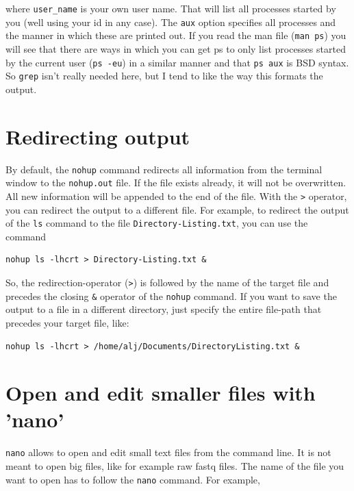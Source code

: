 \documentclass[11pt]{article}
\begin{document}
where \texttt{user\_name} is your own user name. That will list all processes started by
you (well using your id in any case). The \texttt{aux} option specifies all processes and
the manner in which these are printed out. If you read the man file (\texttt{man ps}) you
will see that there are ways in which you can get ps to only list processes started
by the current user (\texttt{ps -eu}) in a similar manner and that \texttt{ps aux} is BSD syntax.
So \texttt{grep} isn't really needed here, but I tend to like the way this formats the output.

\section{Redirecting output}
\label{sec-7}
By default, the \texttt{nohup} command redirects all information from the
terminal window to the \texttt{nohup.out} file. If the file exists already,
it will not be overwritten. All new information will be appended to
the end of the file. With the \texttt{>} operator, you can redirect the
output to a different file. For example, to redirect the output of the
\texttt{ls} command to the file \texttt{Directory-Listing.txt}, you can use the
command

\begin{verbatim}
nohup ls -lhcrt > Directory-Listing.txt &
\end{verbatim}

So, the redirection-operator (\texttt{>}) is followed by the name of the
target file and precedes the closing \texttt{\&} operator of the \texttt{nohup}
command. If you want to save the output to a file in a different
directory, just specify the entire file-path that precedes your target
file, like:

\begin{verbatim}
nohup ls -lhcrt > /home/alj/Documents/DirectoryListing.txt &
\end{verbatim}

\section{Open and edit smaller files with 'nano'}
\label{sec-8}
\texttt{nano} allows to open and edit small text files from the command
line. It is not meant to open big files, like for example raw fastq
files. The name of the file you want to open has to follow the \texttt{nano}
command. For example,
\end{document}
